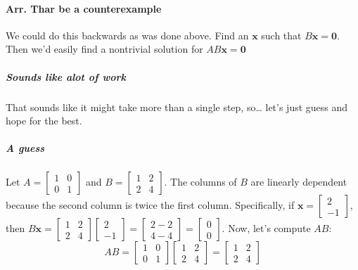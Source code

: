 \documentclass{article}
\begin{document}
            \paragraph{Arr. Thar be a counterexample}
                We could do this backwards as was done above. Find an $\mathbf{x}$
                such that $B\mathbf{x} = \mathbf{0}$. Then we'd easily find a nontrivial
                solution for $AB\mathbf{x}=\mathbf{0}$ 
                \subparagraph{Sounds like alot of work}
                    That sounds like it might take more than a single step, so\dots
                    let's just guess and hope for the best.
                \subparagraph{A guess}
                    Let $A = \begin{bmatrix} 1 & 0 \\ 0 & 1 \end{bmatrix}$ and $B = \begin{bmatrix} 1 & 2 \\ 2 & 4 \end{bmatrix}$.
                    The columns of $B$ are linearly dependent because the second column is twice the first column.
                    Specifically, if $\mathbf{x} = \begin{bmatrix} 2 \\ -1 \end{bmatrix}$, then $B\mathbf{x} = \begin{bmatrix} 1 & 2 \\ 2 & 4 \end{bmatrix} \begin{bmatrix} 2 \\ -1 \end{bmatrix} = \begin{bmatrix} 2-2 \\ 4-4 \end{bmatrix} = \begin{bmatrix} 0 \\ 0 \end{bmatrix}$.
                    Now, let's compute $AB$:
                    \[
                        AB = \begin{bmatrix} 1 & 0 \\ 0 & 1 \end{bmatrix} \begin{bmatrix} 1 & 2 \\ 2 & 4 \end{bmatrix} = \begin{bmatrix} 1 & 2 \\ 2 & 4 \end{bmatrix}
                    \]
\end{document}
